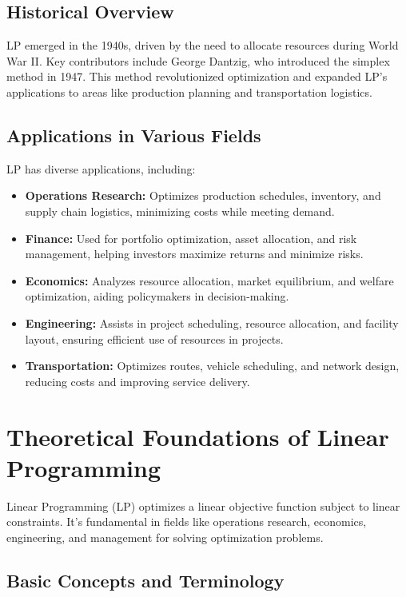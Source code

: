 \documentclass[12pt]{book} %
\begin{document}
\subsection{Historical Overview}

LP emerged in the 1940s, driven by the need to allocate resources during World War II. Key contributors include George Dantzig, who introduced the simplex method in 1947. This method revolutionized optimization and expanded LP's applications to areas like production planning and transportation logistics.

\subsection{Applications in Various Fields}

LP has diverse applications, including:

\begin{itemize}
    \item \textbf{Operations Research:} Optimizes production schedules, inventory, and supply chain logistics, minimizing costs while meeting demand.
    \item \textbf{Finance:} Used for portfolio optimization, asset allocation, and risk management, helping investors maximize returns and minimize risks.
    \item \textbf{Economics:} Analyzes resource allocation, market equilibrium, and welfare optimization, aiding policymakers in decision-making.
    \item \textbf{Engineering:} Assists in project scheduling, resource allocation, and facility layout, ensuring efficient use of resources in projects.
    \item \textbf{Transportation:} Optimizes routes, vehicle scheduling, and network design, reducing costs and improving service delivery.
\end{itemize}

\section{Theoretical Foundations of Linear Programming}

Linear Programming (LP) optimizes a linear objective function subject to linear constraints. It's fundamental in fields like operations research, economics, engineering, and management for solving optimization problems.

\subsection{Basic Concepts and Terminology}
\end{document}
